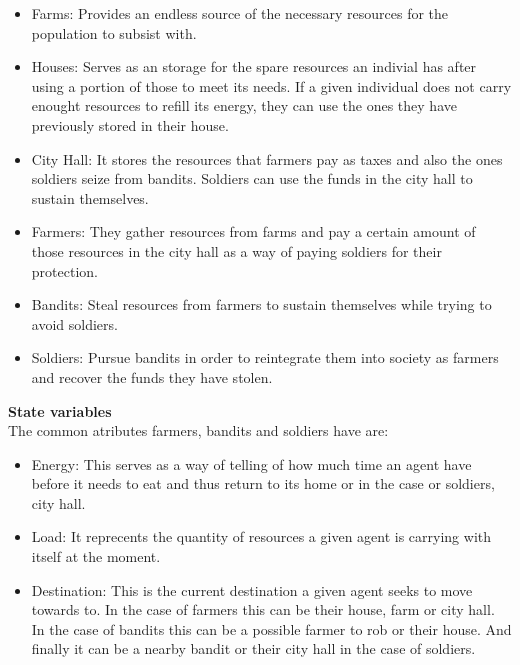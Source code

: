 \documentclass{wscpaperproc}
\begin{document}
\begin{itemize}
    \item Farms: Provides an endless source of the necessary resources for the
    population to subsist with.

    \item Houses: Serves as an storage for the spare resources an indivial has
    after using a portion of those to meet its needs. If a given individual
    does not carry enought resources to refill its energy, they can use the
    ones they have previously stored in their house.

    \item City Hall: It stores the resources that farmers pay as taxes and also
    the ones soldiers seize from bandits. Soldiers can use the funds in the
    city hall to sustain themselves.

    \item Farmers: They gather resources from farms and pay a certain amount of
    those resources in the city hall as a way of paying soldiers for their
    protection.

    \item Bandits: Steal resources from farmers to sustain themselves while
    trying to avoid soldiers.

    \item Soldiers: Pursue bandits in order to reintegrate them into society as
    farmers and recover the funds they have stolen.
\end{itemize}

\newpage

\noindent \textbf{State variables}\\

\noindent The common atributes farmers, bandits and soldiers have are:

\begin{itemize}
    \item Energy: This serves as a way of telling of how much time an agent
    have before it needs to eat and thus return to its home or in the case or
    soldiers, city hall.

    \item Load: It reprecents the quantity of resources a given agent is
    carrying with itself at the moment.

    \item Destination: This is the current destination a given agent seeks to
    move towards to. In the case of farmers this can be their house, farm or
    city hall. In the case of bandits this can be a possible farmer to rob or
    their house. And finally it can be a nearby bandit or their city hall in
    the case of soldiers.
\end{itemize}
\end{document}
